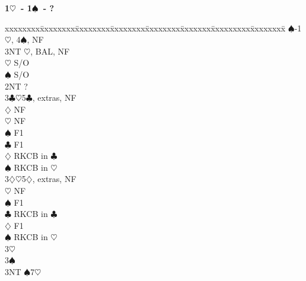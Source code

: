\documentclass[10pt]{article}
\renewcommand{\c}{$\clubsuit$}
\renewcommand{\d}{$\diamondsuit$}
\newcommand{\h}{$\heartsuit$}
\newcommand{\s}{$\spadesuit$}
\newenvironment{bidtable}[1][]
{\textbf{#1}
  \begin{adjustwidth}{1em}{}
    \addvspace{2pt}
    \begin{tabbing}
      xxxxxxxx\=xxxxxxxx\=xxxxxxxx\=xxxxxxxx\=xxxxxxxx\=xxxxxxx\=xxxxxxxxx\=xxxxxxxx\=\kill}
{\end{tabbing}\end{adjustwidth}\bigskip}%
\begin{document}
\begin{bidtable}[1\h\ - 1\s\ - ?]
    \s  {}-1\h, 4\s, NF                       \\
    \> 3NT  \h, BAL, NF                         \\
    \h  \> S/O                                  \\
    \s  \> S/O                                  \\
2NT \> ?                                            \\
3\c {}\h 5\c, extras, NF                          \\
    \d  \> NF                                   \\
    \h  \> NF                                   \\
    \s  \> F1                                   \\
    \c  \> F1                                   \\
    \d  \> RKCB in \c                           \\
    \s  \> RKCB in \h                           \\
3\d {}\h 5\d, extras, NF                          \\
    \h  \> NF                                   \\
    \s  \> F1                                   \\
    \c  \> RKCB in \c                           \\
    \d  \> F1                                   \\
    \s  \> RKCB in \h                           \\
3\h \>                                              \\
3\s \>                                              \\
3NT \s7\h                                       \\
\end{bidtable}
\end{document}
